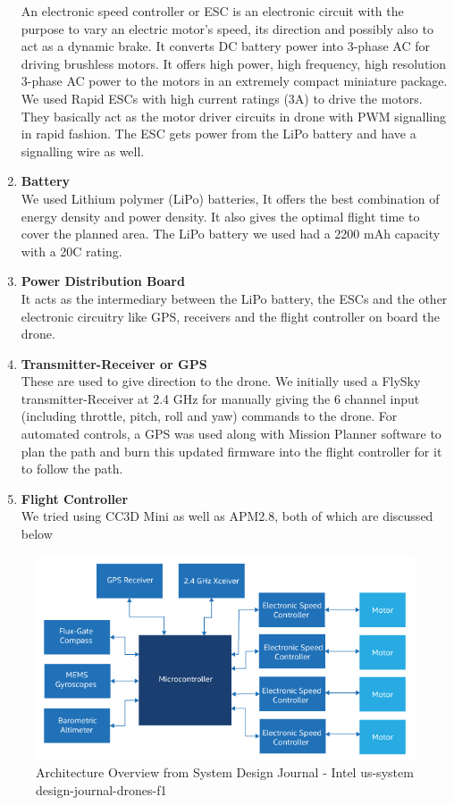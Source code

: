\begin{enumerate}
    An electronic speed controller or ESC is an electronic circuit with the purpose to vary an electric motor's speed, its direction and possibly also to act as a dynamic brake. It converts DC battery power into 3-phase AC for driving brushless motors. It offers high power, high frequency, high resolution 3-phase AC power to the motors in an extremely compact miniature package. We used Rapid ESCs with high current ratings (3A) to drive the motors. They basically act as the motor driver circuits in drone with PWM signalling in rapid fashion. The ESC gets power from the LiPo battery and have a signalling wire as well.
    \item \textbf{Battery}\\ 
    We used Lithium polymer (LiPo) batteries, It offers the best combination of energy density and power density. It also gives the optimal flight time to cover the planned area. The LiPo battery we used had a 2200 mAh capacity with a 20C rating.
    \item \textbf{Power Distribution Board}\\
    It acts as the intermediary between the LiPo battery, the ESCs and the other electronic circuitry like GPS, receivers and the flight controller on board the drone.
    \item \textbf{Transmitter-Receiver or GPS}\\
    These are used to give direction to the drone. We initially used a FlySky transmitter-Receiver at 2.4 GHz for manually giving the 6 channel input (including throttle, pitch, roll and yaw) commands to the drone. For automated controls, a GPS was used along with Mission Planner software to plan the path and burn this updated firmware into the flight controller for it to follow the path. 
    \item \textbf{Flight Controller} \\
    We tried using CC3D Mini as well as APM2.8, both of which are discussed below
\end{enumerate}

\begin{figure}[H]
    \centering
    \includegraphics[]{SummerInterReport/project/Images-Major/block.png}
    \caption{Architecture Overview from System Design Journal - Intel us-system design-journal-drones-f1}
    \label{fig:compEy}
\end{figure}


